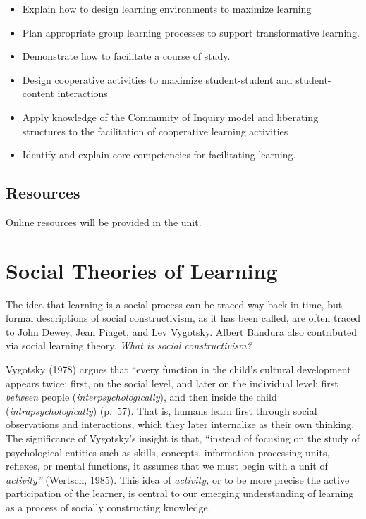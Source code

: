 \documentclass[
]{book}
\providecommand{\tightlist}{%
  \setlength{\itemsep}{0pt}\setlength{\parskip}{0pt}}
\begin{document}
\begin{itemize}
\tightlist
\item
  Explain how to design learning environments to maximize learning
\item
  Plan appropriate group learning processes to support transformative learning.
\item
  Demonstrate how to facilitate a course of study.
\item
  Design cooperative activities to maximize student-student and student-content interactions
\item
  Apply knowledge of the Community of Inquiry model and liberating structures to the facilitation of cooperative learning activities
\item
  Identify and explain core competencies for facilitating learning.
\end{itemize}

\hypertarget{resources-2}{%
\subsection*{Resources}\label{resources-2}}

Online resources will be provided in the unit.

\hypertarget{social-theories-of-learning}{%
\section{Social Theories of Learning}\label{social-theories-of-learning}}

The idea that learning is a social process can be traced way back in time, but formal descriptions of social constructivism, as it has been called, are often traced to John Dewey, Jean Piaget, and Lev Vygotsky. Albert Bandura also contributed via social learning theory. \emph{What is social constructivism?}

Vygotsky (1978) argues that ``every function in the child's cultural development appears twice: first, on the social level, and later on the individual level; first \emph{between} people (\emph{interpsychologically}), and then inside the child (\emph{intrapsychologically}) (p.~57). That is, humans learn first through social observations and interactions, which they later internalize as their own thinking. The significance of Vygotsky's insight is that, ``instead of focusing on the study of psychological entities such as skills, concepts, information-processing units, reflexes, or mental functions, it assumes that we must begin with a unit of \emph{activity''} (Wertsch, 1985). This idea of \emph{activity,} or to be more precise the active participation of the learner, is central to our emerging understanding of learning as a process of socially constructing knowledge.
\end{document}
